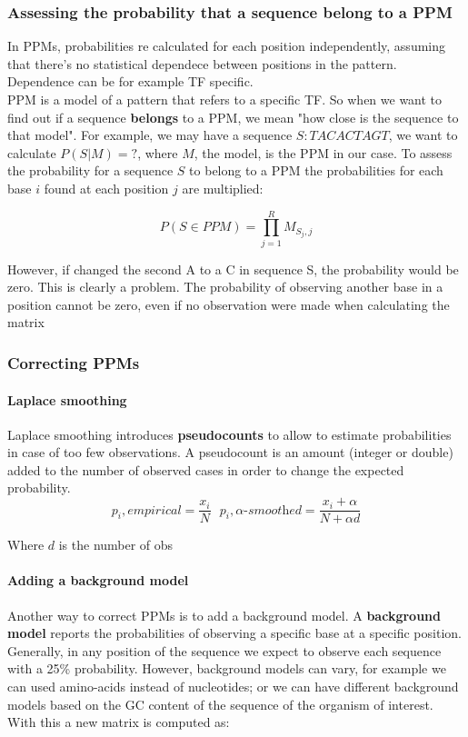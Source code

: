 		\subsubsection{Assessing the probability that a sequence belong to a PPM}
		In PPMs, probabilities re calculated for each position independently, assuming that there's no statistical dependece between positions in the pattern. 
		Dependence can be for example TF specific. 
		\\
		PPM is a model of a pattern that refers to a specific TF. 
		So when we want to find out if a sequence \textbf{belongs} to a PPM, we mean "how close is the sequence to that model". 
		For example, we may have a sequence $S: TACACTAGT$, we want to calculate $P(S|M)=?$, where $M$, the model, is the PPM in our case.
		To assess the probability for a sequence $S$ to belong to a PPM the probabilities for each base $i$ found at each position $j$ are multiplied:

		$$P(S \in PPM) = \prod\limits_{j=1}^R M_{S_j, j}$$
		
		However, if changed the second A to a C in sequence S, the probability would be zero.
		This is clearly a problem.
		The probability of observing another base in a position cannot be zero, even if no observation were made when calculating the matrix
		
		

		\subsubsection{Correcting PPMs}

			\paragraph{Laplace smoothing}
			Laplace smoothing introduces \textbf{pseudocounts} to allow to estimate probabilities in case of too few observations.
			A pseudocount is an amount (integer or double) added to the number of observed cases in order to change the expected probability.
			$$p_i, \textit{empirical} = \frac{x_i}{N} \,\,\,\, p_i, \alpha\textit{-smoothed} = \frac{x_i + \alpha}{N + \alpha d}$$
			
			Where $d$ is the number of obs

			\paragraph{Adding a background model}
			Another way to correct PPMs is to add a background model.
			A \textbf{background model} reports the probabilities of observing a specific base at a specific position. 
			Generally, in any position of the sequence we expect to observe each sequence with a 25\% probability. However, background models can vary, for example we can used amino-acids instead of nucleotides; or we can have different background models based on the GC content of the sequence of the organism of interest. 
			With this a new matrix is computed as:

